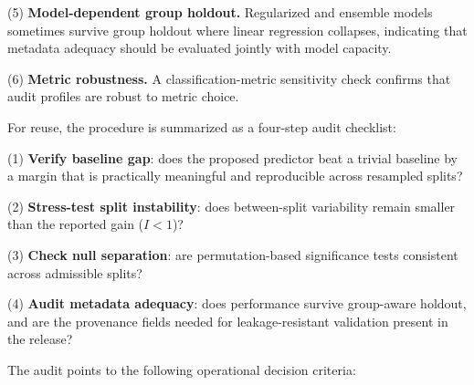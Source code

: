 \documentclass[10pt,letterpaper]{wlscirep}
\begin{document}
(5) \textbf{Model-dependent group holdout.} Regularized and ensemble models sometimes survive group holdout where linear regression collapses, indicating that metadata adequacy should be evaluated jointly with model capacity.

(6) \textbf{Metric robustness.} A classification-metric sensitivity check confirms that audit profiles are robust to metric choice.

For reuse, the procedure is summarized as a four-step audit checklist:

(1) \textbf{Verify baseline gap}: does the proposed predictor beat a trivial baseline by a margin that is practically meaningful and reproducible across resampled splits?

(2) \textbf{Stress-test split instability}: does between-split variability remain smaller than the reported gain ($I < 1$)?

(3) \textbf{Check null separation}: are permutation-based significance tests consistent across admissible splits?

(4) \textbf{Audit metadata adequacy}: does performance survive group-aware holdout, and are the provenance fields needed for leakage-resistant validation present in the release?

The audit points to the following operational decision criteria:

\begin{table}[H]
\centering
\caption{Operational decision criteria derived from the seven-dataset audit. Thresholds are empirically motivated and intended as practical starting points.}
\label{tab:decision_criteria}
%
\end{table}
\end{document}
